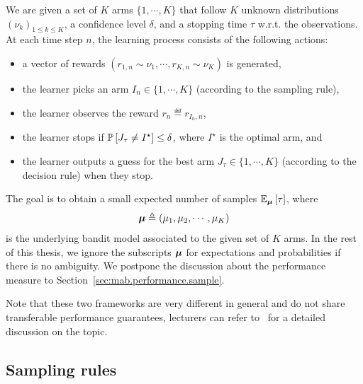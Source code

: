 \begin{definition}\label{def:mab.bai_confidence}
\begin{leftbar}[defnbar]
	We are given a set of $K$ arms $\{1,\cdots,K\}$ that follow $K$ unknown distributions $(\nu_k)_{1 \leq k \leq K}$, a confidence level $\delta$, and a stopping time $\tau$ w.r.t. the observations. At each time step $n$, the learning process consists of the following actions:
\begin{itemize}
	\item a vector of rewards $(r_{1,n} \sim \nu_1, \cdots, r_{K,n} \sim \nu_K)$ is generated,
	\item the learner picks an arm $I_n \in \{1,\cdots,K\}$ (according to the sampling rule),
	\item the learner observes the reward $r_n \eqdef r_{I_n, n}$,
	\item the learner stops if $\mathbb{P}\left[J_{\tau}\neq I^\star\right] \leq \delta$, where $I^\star$ is the optimal arm, and
	\item the learner outputs a guess for the best arm $J_\tau \in \{1,\cdots,K\}$ (according to the decision rule) when they stop.
\end{itemize}
\end{leftbar}
\end{definition}

The goal is to obtain a small expected number of samples $\mathbb{E}_{{\boldsymbol \mu}}\left[\tau\right]$, where 
\[
    {\boldsymbol \mu}\triangleq(\mu_1,\mu_2,\cdots,\mu_K)
\]
is the underlying bandit model associated to the given set of $K$ arms. In the rest of this thesis, we ignore the subscripts ${\boldsymbol \mu}$ for expectations and probabilities if there is no ambiguity. We postpone the discussion about the performance measure to Section~\ref{sec:mab.performance.sample}.

\begin{remark}
\begin{leftbar}[remarkbar]\label{remark:mab.two_frameworks}
Note that these two frameworks are very different in general and do not share transferable performance guarantees, lecturers can refer to~\cite{carpentier2016budget} for a detailed discussion on the topic.
\end{leftbar}
\end{remark}

\subsection{Sampling rules}\label{sec:mab.bai.sampling}

